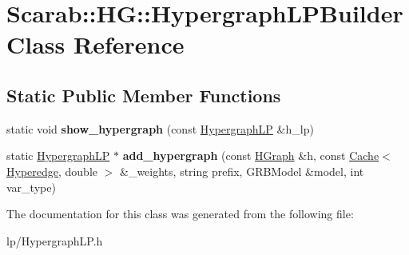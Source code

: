 \hypertarget{classScarab_1_1HG_1_1HypergraphLPBuilder}{
\section{Scarab::HG::HypergraphLPBuilder Class Reference}
\label{classScarab_1_1HG_1_1HypergraphLPBuilder}
}
\subsection*{Static Public Member Functions}
\begin{DoxyCompactItemize}
\item 
\hypertarget{classScarab_1_1HG_1_1HypergraphLPBuilder_a7653a6f997f1505c0d6668618b28d6d8}{
static void {\bfseries show\_\-hypergraph} (const \hyperlink{structScarab_1_1HG_1_1HypergraphLP}{HypergraphLP} \&h\_\-lp)}
\label{classScarab_1_1HG_1_1HypergraphLPBuilder_a7653a6f997f1505c0d6668618b28d6d8}

\item 
\hypertarget{classScarab_1_1HG_1_1HypergraphLPBuilder_a3a711a79152e0f5d4cc9157737673b95}{
static \hyperlink{structScarab_1_1HG_1_1HypergraphLP}{HypergraphLP} $\ast$ {\bfseries add\_\-hypergraph} (const \hyperlink{classScarab_1_1HG_1_1HGraph}{HGraph} \&h, const \hyperlink{classCache}{Cache}$<$ \hyperlink{classScarab_1_1HG_1_1Hyperedge}{Hyperedge}, double $>$ \&\_\-weights, string prefix, GRBModel \&model, int var\_\-type)}
\label{classScarab_1_1HG_1_1HypergraphLPBuilder_a3a711a79152e0f5d4cc9157737673b95}

\end{DoxyCompactItemize}


The documentation for this class was generated from the following file:\begin{DoxyCompactItemize}
\item 
lp/HypergraphLP.h\end{DoxyCompactItemize}

